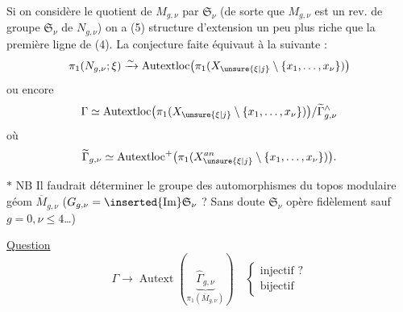 Si on considère le quotient  de $M_{g,\nu}$ par $\mathfrak S_\nu$ (de sorte que $M_{g,\nu}$ est un rev. de groupe $\mathfrak S_\nu$ de $N_{g,\nu}$) on a
\hfill(5)
structure d'extension un peu plus riche que la première ligne de (4). La conjecture faite équivaut à la suivante :
\[
\pi_1(N_{g,\nu};\xi)\xrightarrow{\sim}\operatorname{Autextloc}\bigl(\pi_1(X_{\unsure{\xi|j}}\setminus\{x_1,\ldots,x_\nu\})\bigr)
\]
ou encore
\[
\Gamma\simeq\operatorname{Autextloc}\bigl(\pi_1(X_{\unsure{\xi|j}}\setminus\{x_1,\ldots,x_\nu\})\bigr)/\widetilde\Gamma_{g,\nu}^{\wedge}
\]
où
\[
\widetilde\Gamma_{g,\nu}\simeq\operatorname{Autextloc}^{+}\bigl(\pi_1(X_{\unsure{\xi|j}}^{an}\setminus\{x_1,\ldots,x_\nu\})\bigr).
\]

$*$ NB Il faudrait déterminer le groupe des automorphismes  du topos modulaire géom $\overline M_{g,\nu}$  ($G_{g,\nu}=\inserted{\operatorname{Im}}\mathfrak S_\nu$ ? \unsure{\}} Sans doute $\mathfrak S_\nu$ opère fidèlement sauf $g=0,\nu\leq4$\ldots)

\uline{Question}
\[
\Gamma\longrightarrow\operatorname{Autext}\left(\underbrace{\widehat\Gamma_{g,\nu}}_{\pi_1(\overline M_{g,\nu})}\right)
\quad\left\{\begin{array}{l}\text{injectif ?}\\\text{bijectif}\end{array}\right.
\]
